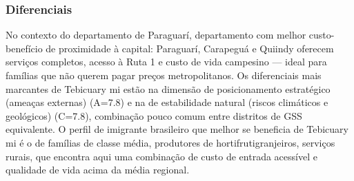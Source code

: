 \subsubsection*{Diferenciais}\label{dif-tebicuary-mi-0914}
No contexto do departamento de Paraguarí, departamento com melhor custo-benefício de proximidade à capital: Paraguarí, Carapeguá e Quiindy oferecem serviços completos, acesso à Ruta 1 e custo de vida campesino — ideal para famílias que não querem pagar preços metropolitanos. Os diferenciais mais marcantes de Tebicuary mi estão na dimensão de posicionamento estratégico (ameaças externas) (A=7.8) e na de estabilidade natural (riscos climáticos e geológicos) (C=7.8), combinação pouco comum entre distritos de GSS equivalente. O perfil de imigrante brasileiro que melhor se beneficia de Tebicuary mi é o de famílias de classe média, produtores de hortifrutigranjeiros, serviços rurais, que encontra aqui uma combinação de custo de entrada acessível e qualidade de vida acima da média regional.
